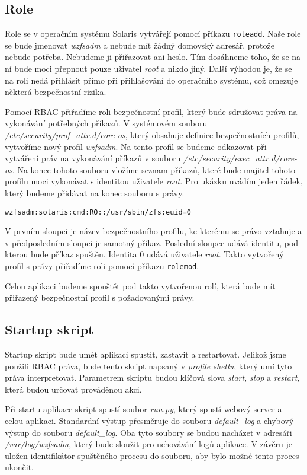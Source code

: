 \subsection{Role}
Role se v operačním systému Solaris vytvářejí pomocí příkazu \verb|roleadd|. Naše role se bude jmenovat \emph{wzfsadm} a nebude mít žádný domovský adresář, protože nebude potřeba. Nebudeme ji přiřazovat ani heslo. Tím dosáhneme toho, že se na ní bude moci přepnout pouze uživatel \emph{root} a nikdo jiný. Další výhodou je, že se na roli nedá přihlásit přímo při přihlašování do operačního systému, což omezuje některá bezpečnostní rizika.

Pomocí RBAC přiřadíme roli bezpečnostní profil, který bude sdružovat práva na vykonávání potřebných příkazů. V systémovém souboru \emph{/etc/security/prof\_attr.d/core-os}, který obsahuje definice bezpečnostních profilů, vytvoříme nový profil \emph{wzfsadm}. Na tento profil se budeme odkazovat při vytváření práv na vykonávání příkazů v souboru \emph{/etc/security/exec\_attr.d/core-os}. Na konec tohoto souboru vložíme seznam příkazů, které bude majitel tohoto profilu moci vykonávat s identitou uživatele \emph{root}. Pro ukázku uvádím jeden řádek, který budeme přidávat na konec souboru s právy.
\begin{verbatim}
wzfsadm:solaris:cmd:RO::/usr/sbin/zfs:euid=0
\end{verbatim}
V prvním sloupci je název bezpečnostního profilu, ke kterému se právo vztahuje a v předposledním sloupci je samotný příkaz. Poslední sloupec udává identitu, pod kterou bude příkaz spuštěn. Identita 0 udává uživatele \emph{root}. Takto vytvořený profil s právy přiřadíme roli pomocí příkazu \verb|rolemod|.

Celou aplikaci budeme spouštět pod takto vytvořenou rolí, která bude mít přiřazený bezpečnostní profil s požadovanými právy.
\subsection{Startup skript}
Startup skript bude umět aplikaci spustit, zastavit a restartovat. Jelikož jsme použili RBAC práva, bude tento skript napsaný v \emph{profile shellu}, který umí tyto práva interpretovat. Parametrem skriptu budou klíčová slova \emph{start}, \emph{stop} a \emph{restart}, která budou určovat prováděnou akci.

Při startu aplikace skript spustí soubor \emph{run.py}, který spustí webový server a celou aplikaci. Standardní výstup přesměruje do souboru \emph{default\_log} a chybový výstup do souboru \emph{default\_log}. Oba tyto soubory se budou nacházet v adresáři \emph{/var/log/wzfsadm}, který bude sloužit pro uchovávání logů aplikace. V závěru je uložen identifikátor spuštěného procesu do souboru, aby bylo možné tento proces ukončit.

